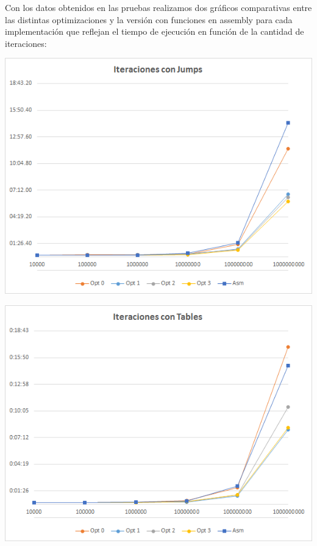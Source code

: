 \documentclass[a4paper, 10pt, twoside, notitlepage]{article}
\begin{document}
\newpage
\normalsize
Con los datos obtenidos en las pruebas realizamos dos gráficos comparativas entre las distintas optimizaciones y la versión con funciones en assembly para cada implementación que reflejan el tiempo de ejecución en función de la cantidad de iteraciones:

\includegraphics[scale=0.9]{chart1.png} 

\includegraphics[scale=0.9]{chart2.png} 
\end{document}
